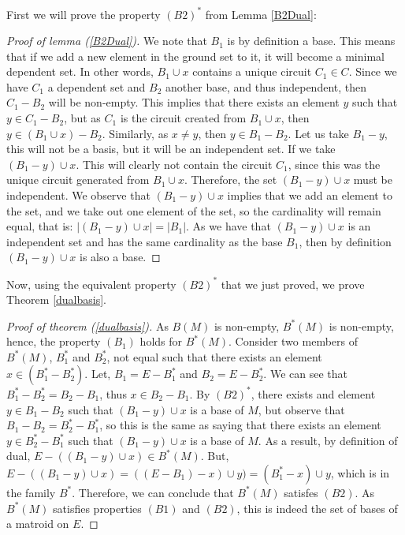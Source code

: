First we will prove the property $(B2)^*$ from Lemma \ref{B2Dual}:
\begin{proof}[Proof of lemma (\ref{B2Dual})]
  We note that $B_1$ is by definition a base. This means that if we add a new element in the ground set to it, it will become a minimal dependent set. In other words, $B_1 \cup x$ contains a unique circuit $C_1 \in C$. Since we have $C_1$ a dependent set and $B_2$ another base, and thus independent, then $C_1 - B_2$ will be non-empty. This implies that there exists an element $y$ such that $y \in C_1 - B_2$, but as $C_1$ is the circuit created from $B_1 \cup x$, then $y \in (B_1 \cup x) - B_2$. Similarly, as $x \neq y$, then $y \in B_1 - B_2$. Let us take $B_1 - y$, this will not be a basis, but it will be an independent set. If we take $(B_1 - y)\cup x$. This will clearly not contain the circuit $C_1$, since this was the unique circuit generated from $B_1 \cup x$. Therefore, the set $(B_1 - y)\cup x$ must be independent. We observe that $(B_1 - y)\cup x$ implies that we add an element to the set, and we take out one element of the set, so the cardinality will remain equal, that is: $|(B_1 - y)\cup x|=|B_1|$.
As we have that $(B_1 - y)\cup x$ is an independent set and has the same cardinality as the base $B_1$, then by definition $(B_1 - y)\cup x$ is also a base. 
\end{proof}

Now, using the equivalent property $(B2)^*$ that we just proved, we prove Theorem \ref{dualbasis}.
\begin{proof}[Proof of theorem (\ref{dualbasis})]
    As $B(M)$ is non-empty, $B^*(M)$ is non-empty, hence, the property $(B_1)$ holds for $B^*(M)$. 
    Consider two members of $B^*(M)$, $B^*_1$ and $B^*_2$, not equal such that there exists an element $x \in (B^*_1 - B^*_2)$. Let, $B_1 = E - B^*_1$ and $B_2 = E - B^*_2$. We can see that $B^*_1 - B^*_2 = B_2 - B_1$, thus $x \in B_2 - B_1$. By $(B2)^*$, there exists and element $y \in  B_1 - B_2$ such that $(B_1 - y)\cup x$ is a base of $M$, but observe that $B_1 - B_2 = B^*_2 - B^*_1$, so this is the same as saying that there exists an element $y \in  B^*_2 - B^*_1$ such that $(B_1 - y)\cup x$ is a base of $M$. As a result, by definition of dual, $E-((B_1 - y)\cup x) \in B^*(M)$. But, $E-((B_1 - y)\cup x) = ((E-B_1)-x)\cup y) = (B_1^* - x)\cup y$, which is in the family $B^*$. Therefore, we can conclude that $B^*(M)$ satisfes $(B2)$. As $B^*(M)$ satisfies  properties $(B1)$ and $(B2)$, this is indeed the set of bases of a matroid on $E$.
\end{proof}

